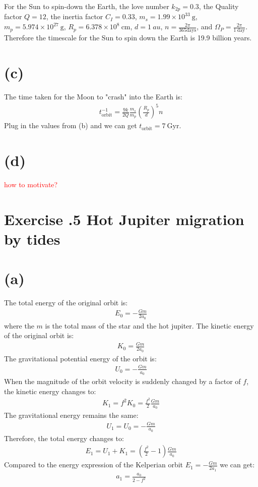 \documentclass[a4paper,12pt]{article}
\newcommand{\cm}{\mathrm{cm}}
\newcommand{\g}{\mathrm{g}}
\begin{document}
For the Sun to spin-down the Earth, the love number $k_{2p} = 0.3$, the Quality factor $Q = 12$, 
the inertia factor $C_I = 0.33$, $m_s = 1.99\times 10^{33}\ \g$, $m_p =5.974\times 10^{27} \ \g $, $R_p = 6.378\times 10^8 \ \cm$, $d = 1 \ au$, $n = \frac{2\pi}{365 \text{days}}$, and $\Omega_P = \frac{2\pi}{1 \ \text{day}}$.
Therefore the timescale for the Sun to spin down the Earth is 19.9 billion years.

\section*{(c)}
The time taken for the Moon to "crash" into the Earth is:
\begin{align*}
    t_{\text{orbit}}^{-1} = \frac{9k}{2Q} \frac{m_s}{m_p} (\frac{R_p}{d})^5 n
\end{align*}
Plug in the values from (b) and we can get $t_{\text{orbit}} = 7 \ \text{Gyr}$.

\section*{(d)}
\textcolor{red}{how to motivate?}

\section*{\textbf{Exercise \uppercase\expandafter{}.5 Hot Jupiter migration by tides}}
\section*{(a)}
The total energy of the original orbit is:
\begin{align*}
    E_0 = -\frac{Gm}{2a_0}
\end{align*}
where the $m$ is the total mass of the star and the hot jupiter.
The kinetic energy of the original orbit is:
\begin{align*}
    K_0 = \frac{Gm}{2a_0}
\end{align*}
The gravitational potential energy of the orbit is:
\begin{align*}
    U_0 = - \frac{Gm}{a_0}
\end{align*}
When the magnitude of the orbit velocity is suddenly changed by a factor of $f$, the kinetic energy changes to:
\begin{align*}
    K_1 = f^2 K_0 = \frac{f^2}{2} \frac{Gm}{a_0}
\end{align*}
The gravitational energy remains the same:
\begin{align*}
    U_1 = U_0 = - \frac{Gm}{a_0}
\end{align*}
Therefore, the total energy changes to:
\begin{align*}
    E_1 = U_1 + K_1 = (\frac{f^2}{2} - 1) \frac{Gm}{a_0}
\end{align*}
Compared to the energy expression of the Kelperian orbit $E_1 = - \frac{Gm}{2a_1}$ we can get:
\begin{align*}
    a_1 = \frac{a_0}{2 - f^2}
\end{align*}
\end{document}
